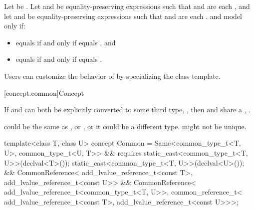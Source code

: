 \begin{itemdescr}
\pnum
Let  be .
Let  and  be equality-preserving
expressions such that
 and  are each , and
let  and  be equality-preserving expressions such that
 and  are each .
 and  model 
only if:
\begin{itemize}
\item {} equals  if and only if
   equals , and
\item {} equals  if and only if
   equals .
\end{itemize}

\pnum
\begin{note}
Users can customize the behavior of  by specializing
the  class template.
\end{note}
\end{itemdescr}

[concept.common]{Concept }

\pnum
If  and  can both be explicitly converted to some third type,
, then  and  share a ,
.
\begin{note}
 could be the same as , or , or it could be a
different type.  might not be unique.
\end{note}

%
\begin{itemdecl}
template<class T, class U>
  concept Common =
    Same<common_type_t<T, U>, common_type_t<U, T>> &&
    requires {
      static_cast<common_type_t<T, U>>(declval<T>());
      static_cast<common_type_t<T, U>>(declval<U>());
    } &&
    CommonReference<
      add_lvalue_reference_t<const T>,
      add_lvalue_reference_t<const U>> &&
    CommonReference<
      add_lvalue_reference_t<common_type_t<T, U>>,
      common_reference_t<
        add_lvalue_reference_t<const T>,
        add_lvalue_reference_t<const U>>>;
\end{itemdecl}

